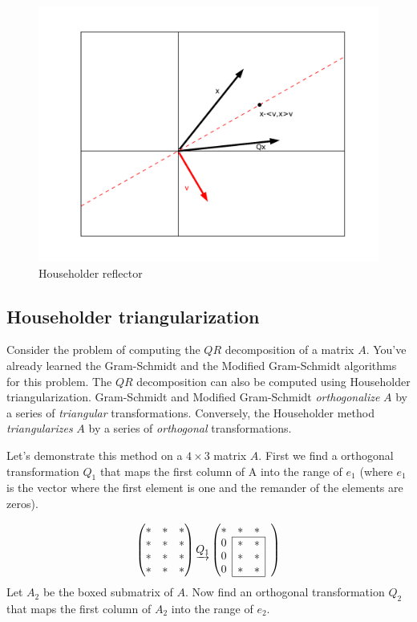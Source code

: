 \begin{figure}
	\centering
	\includegraphics[width= \textwidth]{fig1}
	\caption{Householder reflector}
	\label{fig:Householder reflector}
\end{figure}

\subsection*{Householder triangularization}
Consider the problem of computing the $QR$ decomposition of a matrix $A$. You've already learned the Gram-Schmidt and the Modified Gram-Schmidt algorithms for this problem. The $QR$ decomposition can also be computed using Householder triangularization. Gram-Schmidt and Modified Gram-Schmidt \emph{orthogonalize} $A$ by a series of \emph{triangular} transformations. Conversely, the Householder method \emph{triangularizes} $A$ by a series of \emph{orthogonal} transformations.

Let's demonstrate this method on a $4 \times 3$ matrix $A$. First we find a orthogonal transformation $Q_1$ that maps the first column of A into the range of $e_1$ (where $e_1$ is the vector where the first element is one and the remander of the elements are zeros).

\def\mc#1{\multicolumn{1}{c|}{#1}}
\begin{equation*}
\begin{pmatrix}
\ast & \ast & \ast \\
\ast & \ast & \ast \\
\ast & \ast & \ast \\
\ast & \ast & \ast 
\end{pmatrix}
\underrightarrow{Q_1}
\begin{pmatrix}

\ast & \ast & \ast & \\ \cline{2-3}
\mc{0} & \ast & \mc{\ast}& \\
\mc{0} & \ast & \mc{\ast} & \\
\mc{0}& \ast & \mc{\ast} & \\ \cline{2-3}
\end{pmatrix}
\end{equation*}
Let $A_2$ be the boxed submatrix of $A$. Now find an orthogonal transformation $Q_2$ that maps the first column of $A_2$ into the range of $e_2$. 


